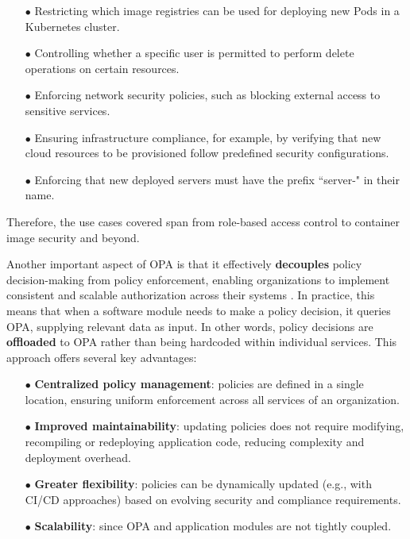 \begin{itemize}[itemsep=0.2pt, topsep=1pt] \item[$\bullet$] Restricting which image registries can be used for deploying new Pods in a Kubernetes cluster.
\item[$\bullet$] Controlling whether a specific user is permitted to perform delete operations on certain resources.
\item[$\bullet$] Enforcing network security policies, such as blocking external access to sensitive services.
\item[$\bullet$] Ensuring infrastructure compliance, for example, by verifying that new cloud resources to be provisioned follow predefined security configurations.
\item[$\bullet$] Enforcing that new deployed servers must have the prefix ``server-" in their name.
\end{itemize}

Therefore, the use cases covered span from role-based access control to container image security and beyond.
\newline


Another important aspect of OPA is that it effectively \textbf{decouples} policy decision-making from policy enforcement, enabling organizations to implement consistent and scalable authorization across their systems \cite{test}.
In practice, this means that when a software module needs to make a policy decision, it queries OPA, supplying relevant data as input. In other words, policy decisions are \textbf{offloaded} to OPA rather than being hardcoded within individual services. This approach offers several key advantages:
\begin{itemize}[itemsep=0.2pt, topsep=1pt]
  \item[$\bullet$] \textbf{Centralized policy management}: policies are defined in a single location, ensuring uniform enforcement across all services of an organization.
  \item[$\bullet$] \textbf{Improved maintainability}: updating policies does not require modifying, recompiling or redeploying application code, reducing complexity and deployment overhead.
  \item[$\bullet$] \textbf{Greater flexibility}: policies can be dynamically updated (e.g., with CI/CD approaches) based on evolving security and compliance requirements. 
  \item[$\bullet$] \textbf{Scalability}: since OPA and application modules are not tightly coupled.
\end{itemize} 

